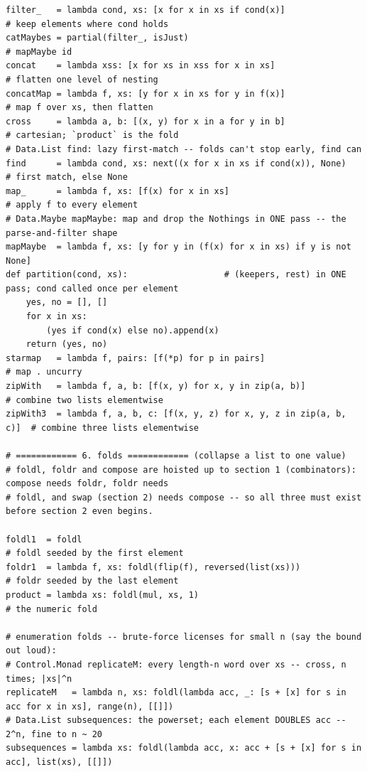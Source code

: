 \documentclass[10pt,letterpaper]{book}
\begin{document}
\begin{lstlisting}[style=file]
filter_   = lambda cond, xs: [x for x in xs if cond(x)]               # keep elements where cond holds
catMaybes = partial(filter_, isJust)                                  # mapMaybe id
concat    = lambda xss: [x for xs in xss for x in xs]                 # flatten one level of nesting
concatMap = lambda f, xs: [y for x in xs for y in f(x)]               # map f over xs, then flatten
cross     = lambda a, b: [(x, y) for x in a for y in b]               # cartesian; `product` is the fold
# Data.List find: lazy first-match -- folds can't stop early, find can
find      = lambda cond, xs: next((x for x in xs if cond(x)), None)   # first match, else None
map_      = lambda f, xs: [f(x) for x in xs]                          # apply f to every element
# Data.Maybe mapMaybe: map and drop the Nothings in ONE pass -- the parse-and-filter shape
mapMaybe  = lambda f, xs: [y for y in (f(x) for x in xs) if y is not None]
def partition(cond, xs):                   # (keepers, rest) in ONE pass; cond called once per element
    yes, no = [], []
    for x in xs:
        (yes if cond(x) else no).append(x)
    return (yes, no)
starmap   = lambda f, pairs: [f(*p) for p in pairs]                   # map . uncurry
zipWith   = lambda f, a, b: [f(x, y) for x, y in zip(a, b)]           # combine two lists elementwise
zipWith3  = lambda f, a, b, c: [f(x, y, z) for x, y, z in zip(a, b, c)]  # combine three lists elementwise

# ============ 6. folds ============ (collapse a list to one value)
# foldl, foldr and compose are hoisted up to section 1 (combinators): compose needs foldr, foldr needs
# foldl, and swap (section 2) needs compose -- so all three must exist before section 2 even begins.

foldl1  = foldl                                                         # foldl seeded by the first element
foldr1  = lambda f, xs: foldl(flip(f), reversed(list(xs)))              # foldr seeded by the last element
product = lambda xs: foldl(mul, xs, 1)                                  # the numeric fold

# enumeration folds -- brute-force licenses for small n (say the bound out loud):
# Control.Monad replicateM: every length-n word over xs -- cross, n times; |xs|^n
replicateM   = lambda n, xs: foldl(lambda acc, _: [s + [x] for s in acc for x in xs], range(n), [[]])
# Data.List subsequences: the powerset; each element DOUBLES acc -- 2^n, fine to n ~ 20
subsequences = lambda xs: foldl(lambda acc, x: acc + [s + [x] for s in acc], list(xs), [[]])


\end{lstlisting}
\end{document}
